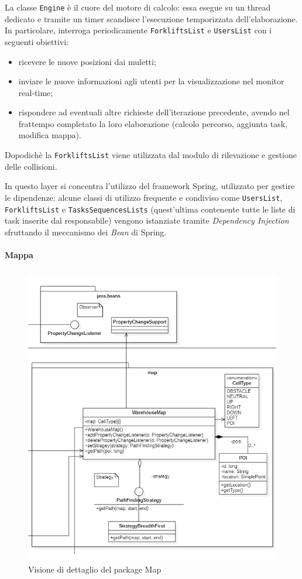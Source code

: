 La classe \texttt{Engine} è il cuore del motore di calcolo: essa esegue su un thread dedicato e tramite un timer scandisce l'esecuzione temporizzata dell'elaborazione. In particolare, interroga periodicamente \texttt{ForkliftsList} e \texttt{UsersList} con i seguenti obiettivi:
\begin{itemize}
	\item ricevere le nuove posizioni dai muletti;
	\item inviare le nuove informazioni agli utenti per la visualizzazione nel monitor real-time;
	\item rispondere ad eventuali altre richieste dell'iterazione precedente, avendo nel frattempo completato la loro elaborazione (calcolo percorso, aggiunta task, modifica mappa).
\end{itemize}
Dopodichè la \texttt{ForkliftsList} viene utilizzata dal modulo di rilevazione e gestione delle collisioni.

In questo layer si concentra l'utilizzo del framework Spring, utilizzato per gestire le dipendenze: alcune classi di utilizzo frequente e condiviso come \texttt{UsersList}, \texttt{ForkliftsList} e \texttt{TasksSequencesLists} (quest'ultima contenente tutte le liste di task inserite dal responsabile) vengono istanziate tramite \textit{Dependency Injection} sfruttando il meccanismo dei \textit{Bean} di Spring.




\paragraph{Mappa}
\subparagraph*{ }

\begin{figure}[H]
	\centering
	\includegraphics[scale=0.60]{res/diagrams/server/server_pack_map.jpg}
	\caption{Visione di dettaglio del package Map}
\end{figure}


